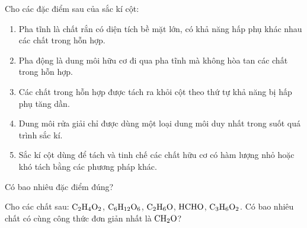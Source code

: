 \documentclass[12pt,a4paper]{article}
\begin{document}
\begin{ex}
Cho các đặc điểm sau của sắc kí cột:
\begin{enumerate}[(1)]
	\item Pha tĩnh là chất rắn có diện tích bề mặt lớn, có khả năng hấp phụ khác nhau các chất trong hỗn hợp.
	\item Pha động là dung môi hữu cơ đi qua pha tĩnh mà không hòa tan các chất trong hỗn hợp.
	\item Các chất trong hỗn hợp được tách ra khỏi cột theo thứ tự khả năng bị hấp phụ tăng dần.
	\item Dung môi rửa giải chỉ được dùng một loại dung môi duy nhất trong suốt quá trình sắc kí.
	\item Sắc kí cột dùng để tách và tinh chế các chất hữu cơ có hàm lượng nhỏ hoặc khó tách bằng các phương pháp khác.
\end{enumerate}
Có bao nhiêu đặc điểm đúng?

\end{ex}

\begin{ex}
Cho các chất sau: $\ce{C2H4O2}$, $\ce{C6H12O6}$, $\ce{C2H6O}$, $\ce{HCHO}$, $\ce{C3H6O2}$. Có bao nhiêu chất có cùng công thức đơn giản nhất là $\ce{CH2O}$?

\end{ex}
\end{document}
